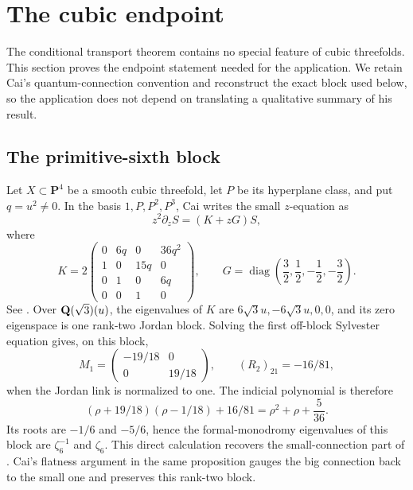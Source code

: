 \section{The cubic endpoint}
\label{sec:cubic-endpoint}

The conditional transport theorem contains no special feature of cubic threefolds.  This
section proves the endpoint statement needed for the application.  We retain
Cai's quantum-connection convention and reconstruct the exact block used
below, so the application does not depend on translating a qualitative
summary of his result.

\subsection{The primitive-sixth block}

Let \(X\subset\mathbf P^4\) be a smooth cubic threefold, let \(P\) be its
hyperplane class, and put \(q=u^2\ne0\).  In the basis
\(1,P,P^2,P^3\), Cai writes the small \(z\)-equation as
\[
 z^2\partial_zS=(K+zG)S,                                    \tag{9.1}
\]
where
\[
 K=2\begin{pmatrix}
 0&6q&0&36q^2\\
 1&0&15q&0\\
 0&1&0&6q\\
 0&0&1&0
 \end{pmatrix},
 \qquad
 G=\operatorname{diag}\!\left(\frac32,\frac12,-\frac12,-\frac32\right).
                                                                    \tag{9.2}
\]
See \cite[Section~3]{Cai}.  Over \(\mathbf Q(\sqrt3)(u)\), the eigenvalues of \(K\)
are \(6\sqrt3u,-6\sqrt3u,0,0\), and its zero eigenspace is one rank-two
Jordan block.  Solving the first off-block Sylvester equation gives, on this
block,
\[
 M_1=\begin{pmatrix}-19/18&0\\0&19/18\end{pmatrix},
 \qquad (R_2)_{21}=-16/81,                                  \tag{9.3}
\]
when the Jordan link is normalized to one.  The indicial polynomial is
therefore
\[
 (\rho+19/18)(\rho-1/18)+16/81
   =\rho^2+\rho+\frac5{36}.                                 \tag{9.4}
\]
Its roots are \(-1/6\) and \(-5/6\), hence the formal-monodromy eigenvalues
of this block are \(\zeta_6^{-1}\) and \(\zeta_6\).  This direct calculation
recovers the small-connection part of \cite[Proposition~6]{Cai}.  Cai's
flatness argument in the same proposition gauges the big connection back to
the small one and preserves this rank-two block.


